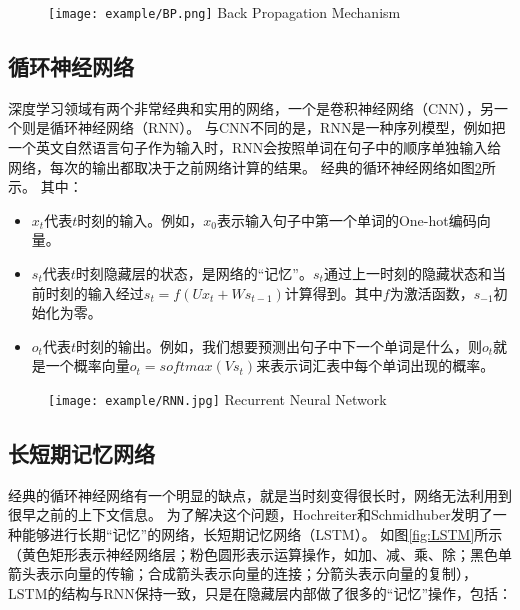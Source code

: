 \begin{figure}[!htp]
  \centering
  \texttt{[image: example/BP.png]}
    {Back Propagation Mechanism}
  \label{fig:BP}
\end{figure}

\subsection{循环神经网络}

深度学习领域有两个非常经典和实用的网络，一个是卷积神经网络（CNN），另一个则是循环神经网络（RNN）\cite{goodfellow2016deep}。
与CNN不同的是，RNN是一种序列模型，例如把一个英文自然语言句子作为输入时，RNN会按照单词在句子中的顺序单独输入给网络，每次的输出都取决于之前网络计算的结果。
经典的循环神经网络如图\ref{fig:RNN}所示。
其中：
\begin{itemize}
  \item $x_t$代表$t$时刻的输入。例如，$x_0$表示输入句子中第一个单词的One-hot编码向量。
  \item $s_t$代表$t$时刻隐藏层的状态，是网络的“记忆”。$s_t$通过上一时刻的隐藏状态和当前时刻的输入经过$s_t = f(Ux_t + Ws_{t-1})$计算得到。其中$f$为激活函数，$s_{-1}$初始化为零。
  \item $o_t$代表$t$时刻的输出。例如，我们想要预测出句子中下一个单词是什么，则$o_t$就是一个概率向量$o_t = softmax(Vs_t)$来表示词汇表中每个单词出现的概率。
\end{itemize}

\begin{figure}[!htp]
  \centering
  \texttt{[image: example/RNN.jpg]}
    {Recurrent Neural Network}
  \label{fig:RNN}
\end{figure}

\subsection{长短期记忆网络}

经典的循环神经网络有一个明显的缺点，就是当时刻变得很长时，网络无法利用到很早之前的上下文信息。
为了解决这个问题，Hochreiter和Schmidhuber发明了一种能够进行长期“记忆”的网络，长短期记忆网络（LSTM）\cite{goodfellow2016deep}。
如图\ref{fig:LSTM}所示（黄色矩形表示神经网络层；粉色圆形表示运算操作，如加、减、乘、除；黑色单箭头表示向量的传输；合成箭头表示向量的连接；分箭头表示向量的复制），LSTM的结构与RNN保持一致，只是在隐藏层内部做了很多的“记忆”操作，包括：

